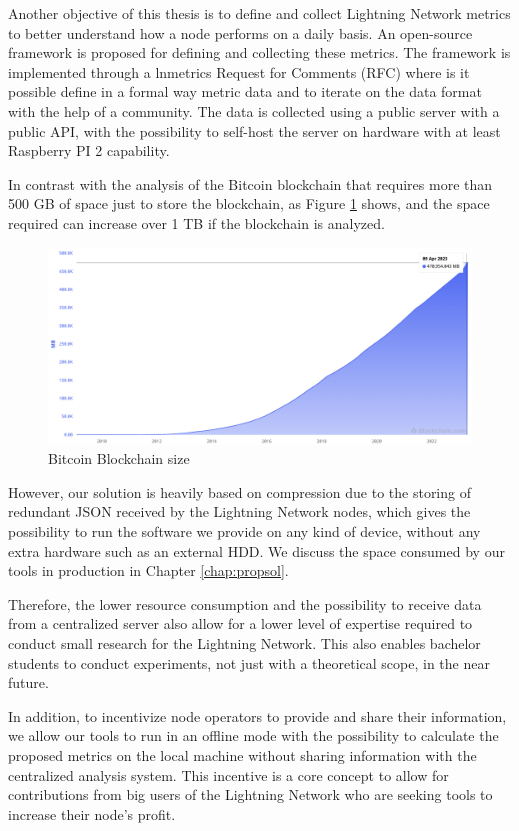 Another objective of this thesis is to define and collect Lightning Network
metrics to better understand how a node performs on a daily basis. An open-source
framework is proposed for defining and collecting these metrics. The framework
is implemented through a lnmetrics Request for Comments (RFC) where is it possible define
in a formal way metric data and to iterate on the data format with the help of a community.
The data is collected using a public server with a public API, with the possibility to
self-host the server on hardware with at least Raspberry PI 2 capability.

In contrast with the analysis of the Bitcoin blockchain that requires more than
500 GB of space just to store the blockchain, as Figure \ref{fig:blockchain_size} shows,
and the space required can increase over 1 TB if the blockchain is analyzed.

\begin{figure}[h]
  \begin{center}
    \includegraphics[width=0.6\columnwidth]{imgs/bitcoin-blockchain-size.png}
  \end{center}
  \caption{Bitcoin Blockchain size}
  \label{fig:blockchain_size}
\end{figure}

However, our solution is heavily based on compression due to the storing of redundant JSON received
by the Lightning Network nodes, which gives the possibility to run the software we provide on
any kind of device, without any extra hardware such as an external HDD. We discuss the space
consumed by our tools in production in Chapter \ref{chap:propsol}.

Therefore, the lower resource consumption and the possibility to receive data from a
centralized server also allow for a lower level of expertise required to conduct small
research for the Lightning Network. This also enables bachelor students to conduct
experiments, not just with a theoretical scope, in the near future.

In addition, to incentivize node operators to provide and share their information, we allow our
tools to run in an offline mode with the possibility to calculate the proposed metrics on the
local machine without sharing information with the centralized analysis system. This incentive
is a core concept to allow for contributions from big users of the Lightning Network who are
seeking tools to increase their node's profit.

